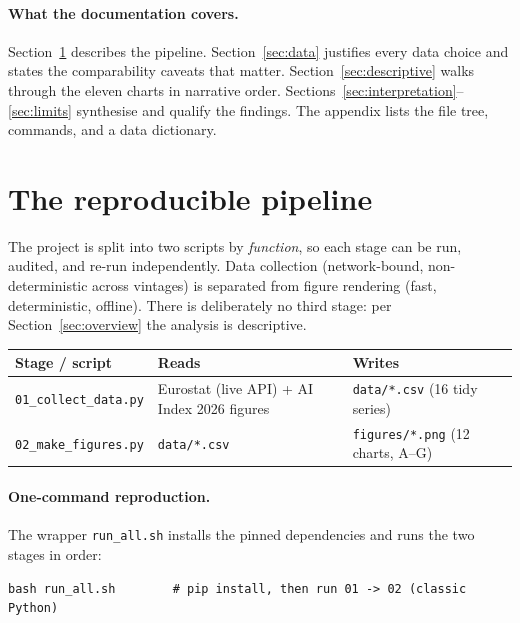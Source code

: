 \documentclass[11pt,a4paper]{article}
\newcommand{\code}[1]{\texttt{#1}}
\begin{document}
\paragraph{What the documentation covers.} Section~\ref{sec:pipeline} describes
the pipeline. Section~\ref{sec:data} justifies every data choice and states the
comparability caveats that matter. Section~\ref{sec:descriptive} walks through
the eleven charts in narrative order. Sections~\ref{sec:interpretation}--%
\ref{sec:limits} synthesise and qualify the findings. The appendix lists the file
tree, commands, and a data dictionary.

\section{The reproducible pipeline}\label{sec:pipeline}

The project is split into two scripts by \emph{function}, so each stage can be
run, audited, and re-run independently. Data collection (network-bound,
non-deterministic across vintages) is separated from figure rendering (fast,
deterministic, offline). There is deliberately no third stage: per
Section~\ref{sec:overview} the analysis is descriptive.

\begin{center}
\renewcommand{\arraystretch}{1.25}
\begin{tabular}{@{}p{4.4cm} p{4.4cm} p{5.8cm}@{}}
\toprule
\textbf{Stage / script} & \textbf{Reads} & \textbf{Writes} \\
\midrule
\code{01\_collect\_data.py} & Eurostat (live API) + AI Index 2026 figures &
  \code{data/*.csv} (16 tidy series) \\
\code{02\_make\_figures.py} & \code{data/*.csv} &
  \code{figures/*.png} (12 charts, A--G) \\
\bottomrule
\end{tabular}
\end{center}

\paragraph{One-command reproduction.} The wrapper \code{run\_all.sh} installs the
pinned dependencies and runs the two stages in order:
\begin{lstlisting}
bash run_all.sh        # pip install, then run 01 -> 02 (classic Python)
\end{lstlisting}
\end{document}
